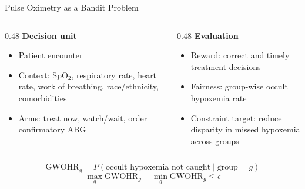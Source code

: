 \documentclass[aspectratio=169,10pt]{beamer}
\begin{document}
\begin{frame}{Pulse Oximetry as a Bandit Problem}
\begin{columns}[T]
\begin{column}{0.48\textwidth}
\textbf{Decision unit}
\begin{itemize}
    \item Patient encounter
    \item Context: SpO$_2$, respiratory rate, heart rate, work of breathing, race/ethnicity, comorbidities
    \item Arms: treat now, watch/wait, order confirmatory ABG
\end{itemize}
\end{column}
\begin{column}{0.48\textwidth}
\textbf{Evaluation}
\begin{itemize}
    \item Reward: correct and timely treatment decisions
    \item Fairness: group-wise occult hypoxemia rate
    \item Constraint target: reduce disparity in missed hypoxemia across groups
\end{itemize}
\end{column}
\end{columns}

\vspace{0.6em}
\begin{equation*}
\text{GWOHR}_g = P(\text{occult hypoxemia not caught} \mid \text{group}=g)
\end{equation*}
\begin{equation*}
\max_g \text{GWOHR}_g - \min_g \text{GWOHR}_g \leq \epsilon
\end{equation*}
\end{frame}
\end{document}
